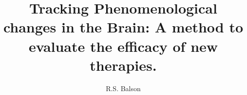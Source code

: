 \documentclass[a4paper,twoside,10pt]{article}%
\begin{document}
\title{Tracking Phenomenological changes in the Brain: A method to evaluate the efficacy of new therapies.}
\author{R.S. Balson}
\maketitle




%
%
%
%
%
%
%
%

%
%
\end{document}
